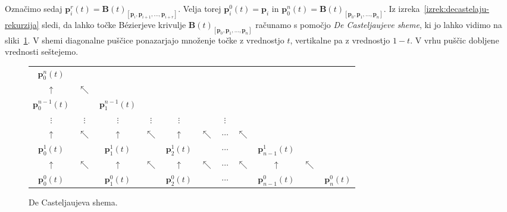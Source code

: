 \documentclass[isrm2, tisk]{fmfdelo}
\newcommand{\p}{\mathbf{p}}
\newcommand{\bigbbt}{\textbf{B}(t)}
\begin{document}
    Označimo sedaj $\p_{i}^r(t) = \bigbbt_{[\p_i,\p_{i+1},\dots,\p_{i+r}]}$.
    Velja torej $\p_{i}^0(t)=\p_i$ in  $\p_{0}^n(t)=\bigbbt_{[\p_0,\p_1,\dots,\p_n]}$.
    Iz izreka~\ref{izrek:decastelaju-rekurzija} sledi, da lahko točke Bézierjeve krivulje $\bigbbt_{[\p_0,\p_1,\dots,\p_n]}$ računamo s pomočjo \textit{De Casteljaujeve sheme}, ki jo lahko vidimo na sliki~\ref{fig:decasteljau-scheme}.
    V shemi diagonalne puščice ponazarjajo množenje točke z vrednostjo $t$, vertikalne pa z vrednostjo $1-t$.
    V vrhu puščic dobljene vrednosti seštejemo.
    \begin{figure}[H]
        \label{fig:decasteljau-scheme}
        \begin{tabular}{ c c c c c c c c c c c}
            $\p_{0}^n(t)$     &            &                   &            &               &            &          &            &                 &            &               \\
            $\uparrow$        & $\nwarrow$ &                   &            &               &            &          &            &                 &            &               \\
            $\p_{0}^{n-1}(t)$ &            & $\p_{1}^{n-1}(t)$ &            &               &            &          &            &                 &            &               \\
            $\vdots$          & $\vdots$   & $\vdots$          & $\vdots$   & $\vdots$      &            & $\vdots$ &            &                 &            &               \\
            $\uparrow$        & $\nwarrow$ & $\uparrow$        & $\nwarrow$ & $\uparrow$    & $\nwarrow$ & $\cdots$ & $\nwarrow$ &                 &            &               \\
            $\p_{0}^1(t)$     &            & $\p_{1}^1(t)$     &            & $\p_{2}^1(t)$ &            & $\cdots$ &            & $\p_{n-1}^1(t)$ &            &               \\
            $\uparrow$        & $\nwarrow$ & $\uparrow$        & $\nwarrow$ & $\uparrow$    & $\nwarrow$ & $\cdots$ & $\nwarrow$ & $\uparrow$      & $\nwarrow$     &\\
            $\p_{0}^0(t)$     &            & $\p_{1}^0(t)$     &            & $\p_{2}^0(t)$ &            & $\cdots$ &            & $\p_{n-1}^0(t)$ &            & $\p_{n}^0(t)$
        \end{tabular}
        \caption{De Casteljaujeva shema.}
    \end{figure}
\end{document}
